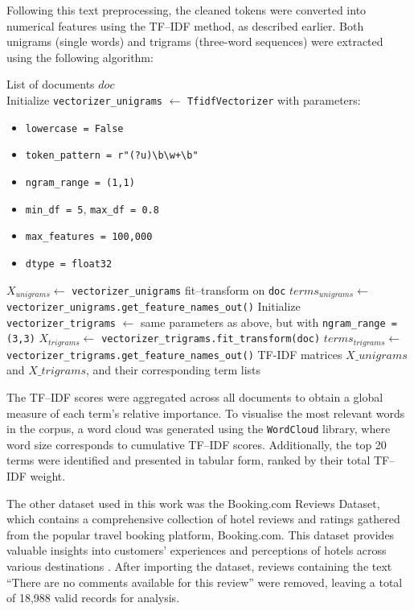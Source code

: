 \documentclass[a4paper, 12pt, twoside]{report}  %
\begin{document}
\indent Following this text preprocessing, the cleaned tokens were converted into numerical features using the TF–IDF method, as described earlier. Both unigrams (single words) and trigrams (three-word sequences) were extracted using the following algorithm:

\begin{algorithm}[ht]
\caption{Computing TF-IDF Vectors}\label{alg:compute_tfidf_vectors}
\begin{algorithmic}[1]
\Require List of documents $doc$ \\
\State Initialize \texttt{vectorizer\_unigrams} $\gets$ \texttt{TfidfVectorizer} with parameters:
\begin{itemize}
    \item \texttt{lowercase = False}
    \item \verb|token_pattern = r"(?u)\b\w+\b"|
    \item \texttt{ngram\_range = (1,1)}
    \item \texttt{min\_df = 5}, \texttt{max\_df = 0.8}
    \item \texttt{max\_features = 100{,}000}
    \item \texttt{dtype = float32}
\end{itemize}
\State $X_{unigrams} \gets$ \texttt{vectorizer\_unigrams} fit–transform on \texttt{doc}
\State $terms_{unigrams} \gets$ \texttt{vectorizer\_unigrams.get\_feature\_names\_out()}
\State Initialize \texttt{vectorizer\_trigrams} $\gets$ same parameters as above, but with \texttt{ngram\_range = (3,3)}
\State $X_{trigrams} \gets$ \texttt{vectorizer\_trigrams.fit\_transform(doc)}
\State $terms_{trigrams} \gets$ \texttt{vectorizer\_trigrams.get\_feature\_names\_out()}
\Ensure TF-IDF matrices $X\_{unigrams}$ and $X\_{trigrams}$, and their corresponding term lists
\end{algorithmic}
\end{algorithm}


\indent The TF–IDF scores were aggregated across all documents to obtain a global measure of each term’s relative importance. To visualise the most relevant words in the corpus, a word cloud was generated using the \texttt{WordCloud} library, where word size corresponds to cumulative TF–IDF scores. Additionally, the top 20 terms were identified and presented in tabular form, ranked by their total TF–IDF weight.

\indent The other dataset used in this work was the Booking.com Reviews Dataset, which contains a comprehensive collection of hotel reviews and ratings gathered from the popular travel booking platform, Booking.com. This dataset provides valuable insights into customers’ experiences and perceptions of hotels across various destinations \cite{bookingdata}. After importing the dataset, reviews containing the text “There are no comments available for this review” were removed, leaving a total of 18,988 valid records for analysis.  
\end{document}
